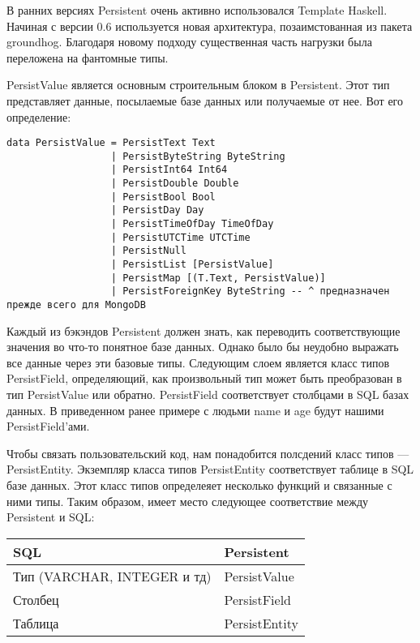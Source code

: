 В ранних версиях Persistent очень активно использовался Template Haskell. Начиная с версии 0.6 используется новая архитектура, позаимстованная из пакета groundhog. Благодаря новому подходу существенная часть нагрузки была переложена на фантомные типы.

PersistValue является основным строительным блоком в Persistent. Этот тип представляет данные, посылаемые базе данных или получаемые от нее. Вот его определение:

\begin{lstlisting}
data PersistValue = PersistText Text
                  | PersistByteString ByteString
                  | PersistInt64 Int64
                  | PersistDouble Double
                  | PersistBool Bool
                  | PersistDay Day
                  | PersistTimeOfDay TimeOfDay
                  | PersistUTCTime UTCTime
                  | PersistNull
                  | PersistList [PersistValue]
                  | PersistMap [(T.Text, PersistValue)]
                  | PersistForeignKey ByteString -- ^ предназначен прежде всего для MongoDB
\end{lstlisting}

Каждый из бэкэндов Persistent должен знать, как переводить соответствующие значения во что-то понятное базе данных. Однако было бы неудобно выражать все данные через эти базовые типы. Следующим слоем является класс типов PersistField, определяющий, как произвольный тип может быть преобразован в тип PersistValue или обратно. PersistField соответствует столбцами в SQL базах данных. В приведенном ранее примере с людьми name и age будут нашими PersistField'ами.

Чтобы связать пользовательский код, нам понадобится полсдений класс типов --- PersistEntity. Экземпляр класса типов PersistEntity соответствует таблице в SQL базе данных. Этот класс типов определеяет несколько функций и связанные с ними типы. Таким образом, имеет место следующее соответствие между Persistent и SQL:

\begin{center}
\begin{tabular}{ | l | l |}
\hline
SQL	& Persistent \\ \hline
Тип (VARCHAR, INTEGER и тд)	& PersistValue \\ \hline
Столбец & PersistField \\ \hline
Таблица	& PersistEntity \\ \hline
\end{tabular}
\end{center}

